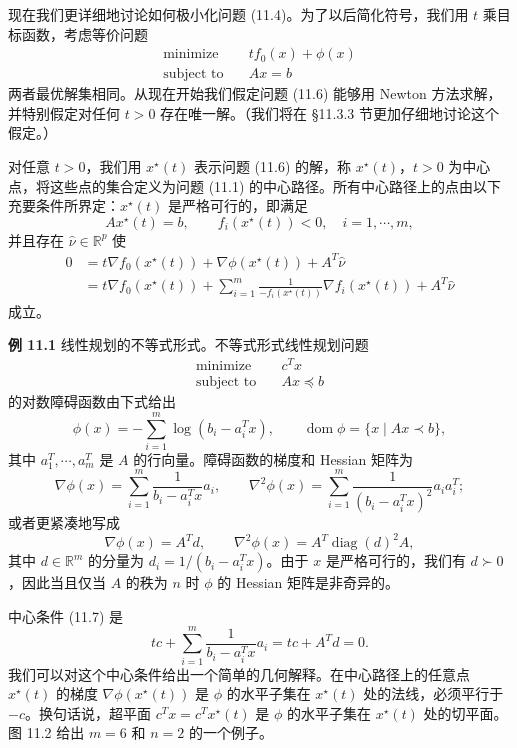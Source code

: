 \documentclass[UTF8,12pt,a4paper,fontset=fandol]{ctexart}
\begin{document}
现在我们更详细地讨论如何极小化问题 (11.4)。为了以后简化符号，我们用 $t$ 乘目标函数，考虑等价问题
\begin{equation}
\begin{aligned}
\text{minimize}\quad & tf_0(x)+\phi(x)\\
\text{subject to}\quad & Ax=b
\end{aligned}
\tag{11.6}
\end{equation}
两者最优解集相同。从现在开始我们假定问题 (11.6) 能够用 Newton 方法求解，并特别假定对任何 $t>0$ 存在唯一解。（我们将在 \S11.3.3 节更加仔细地讨论这个假定。）

对任意 $t>0$，我们用 $x^\star(t)$ 表示问题 (11.6) 的解，称 $x^\star(t)$，$t>0$ 为中心点，将这些点的集合定义为问题 (11.1) 的中心路径。所有中心路径上的点由以下充要条件所界定：$x^\star(t)$ 是严格可行的，即满足
\[
Ax^\star(t)=b,\qquad f_i(x^\star(t))<0,\quad i=1,\cdots,m,
\]
并且存在 $\hat{\nu}\in\mathbb{R}^p$ 使
\begin{equation}
\begin{aligned}
0&=t\nabla f_0(x^\star(t))+\nabla\phi(x^\star(t))+A^T\hat{\nu}\\
&=t\nabla f_0(x^\star(t))+\sum_{i=1}^m\frac{1}{-f_i(x^\star(t))}\nabla f_i(x^\star(t))+A^T\hat{\nu}
\end{aligned}
\tag{11.7}
\end{equation}
成立。

\noindent\textbf{例 11.1}\quad
线性规划的不等式形式。不等式形式线性规划问题
\begin{equation}
\begin{aligned}
\text{minimize}\quad & c^Tx\\
\text{subject to}\quad & Ax\preceq b
\end{aligned}
\tag{11.8}
\end{equation}
的对数障碍函数由下式给出
\[
\phi(x)=-\sum_{i=1}^m\log(b_i-a_i^Tx),\qquad \operatorname{dom}\phi=\{x\mid Ax\prec b\},
\]
其中 $a_1^T,\cdots,a_m^T$ 是 $A$ 的行向量。障碍函数的梯度和 Hessian 矩阵为
\[
\nabla\phi(x)=\sum_{i=1}^m\frac{1}{b_i-a_i^Tx}a_i,\qquad
\nabla^2\phi(x)=\sum_{i=1}^m\frac{1}{(b_i-a_i^Tx)^2}a_ia_i^T;
\]
或者更紧凑地写成
\[
\nabla\phi(x)=A^Td,\qquad \nabla^2\phi(x)=A^T\operatorname{diag}(d)^2A,
\]
其中 $d\in\mathbb{R}^m$ 的分量为 $d_i=1/(b_i-a_i^Tx)$。由于 $x$ 是严格可行的，我们有 $d\succ 0$，因此当且仅当 $A$ 的秩为 $n$ 时 $\phi$ 的 Hessian 矩阵是非奇异的。

中心条件 (11.7) 是
\begin{equation}
tc+\sum_{i=1}^m\frac{1}{b_i-a_i^Tx}a_i=tc+A^Td=0.
\tag{11.9}
\end{equation}
我们可以对这个中心条件给出一个简单的几何解释。在中心路径上的任意点 $x^\star(t)$ 的梯度 $\nabla\phi(x^\star(t))$ 是 $\phi$ 的水平子集在 $x^\star(t)$ 处的法线，必须平行于 $-c$。换句话说，超平面 $c^Tx=c^Tx^\star(t)$ 是 $\phi$ 的水平子集在 $x^\star(t)$ 处的切平面。图 11.2 给出 $m=6$ 和 $n=2$ 的一个例子。
\end{document}
